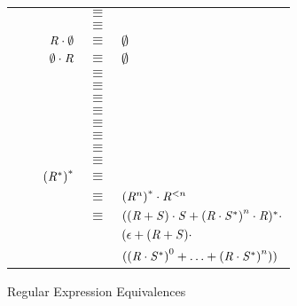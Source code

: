 \begin{figure}
\setcounter{rowcount}{0}
\centering
\begin{tabular}{@{\stepcounter{rowcount}\therowcount.\hspace*{\tabcolsep}}llrcl}
& & \Regex{} & $\equiv$ & \Regex{} \\
& & \RegexOr{\Regex}{\emptyset} & $\equiv$ & \Regex{} \\
& & $\mathit{R}\cdot\emptyset$ & $\equiv$ & $\emptyset$ \\
& & $\emptyset\cdot\mathit{R}$ & $\equiv$ & $\emptyset$ \\
& & \RegexConcat{(\RegexConcat{\Regex{}}{\Regex'})}{\Regex''} & $\equiv$ & \RegexConcat{\Regex{}}{(\RegexConcat{\Regex'}{\Regex''})} \\
& & \RegexOr{(\RegexOr{\Regex}{\Regex'})}{\Regex''} & $\equiv$ & \RegexOr{\Regex}{(\RegexOr{\Regex'}{\Regex''})} \\
& & \RegexOr{\Regex{}}{\RegexAlt{}} & $\equiv$ & \RegexOr{\RegexAlt{}}{\Regex{}}\\
& & \RegexConcat{\Regex{}}{(\RegexOr{\Regex{}'}{\Regex{}''})} & $\equiv$ & \RegexOr{(\RegexConcat{\Regex{}}{\Regex{}'})}{(\RegexConcat{\Regex{}}{\Regex{}''})} \\
& & \RegexConcat{(\RegexOr{\Regex{}'}{\Regex{}''})}{\Regex{}} & $\equiv$ & \RegexOr{(\RegexConcat{\Regex{}'}{\Regex{}})}{(\RegexConcat{\Regex{}''}{\Regex{}})} \\
& & \RegexConcat{\Regex{}}{\EmptyString{}} & $\equiv$ & \Regex{}\\
& & \StarOf{(\RegexOr{\Regex{}}{\RegexAlt{}})} & $\equiv$ & \RegexConcat{\StarOf{(\RegexConcat{\StarOf{\Regex{}}}{\RegexAlt{}})}}{\StarOf{\Regex{}}}\\
& & \StarOf{\RegexConcat{\Regex{}}{\RegexAlt{}}} & $\equiv$ & \RegexOr{\EmptyString{}}{(\RegexConcat{\RegexConcat{\Regex{}}{\StarOf{(\RegexConcat{\RegexAlt{}}{\Regex{}})}}}{\RegexAlt{}})}\\
& & ${(\mathit{R}{}^*)}^*$ & $\equiv$ & \StarOf{\Regex{}}\\
& & \StarOf{\Regex{}} & $\equiv$ & ${(\mathit{R}{}^n)}^*\cdot\mathit{R}{}^{<n}$\\
& & \StarOf{(\RegexOr{\Regex}{\RegexAlt})} & $\equiv$ & $((\mathit{R}+\mathit{S})\cdot\mathit{S}+{(\mathit{R}\cdot\mathit{S}^*)}^n\cdot\mathit{R})^*\cdot$\\
& & & & $(\epsilon+(\mathit{R}+\mathit{S})\cdot$\\
& & & & $({(\mathit{R}\cdot\mathit{S}^*)}^0+\ldots+{(\mathit{R}\cdot\mathit{S}^*)}^n))$
\end{tabular}
\caption{Regular Expression Equivalences}
\label{fig:regex-equivalence-rules}
\end{figure}
